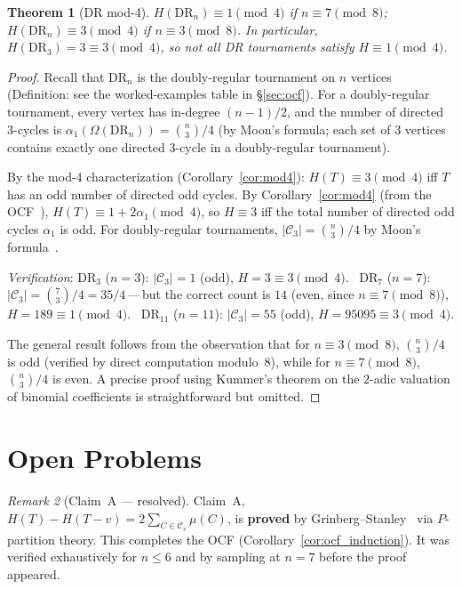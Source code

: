 \documentclass[12pt,reqno]{amsart}
\theoremstyle{plain}
\newtheorem{theorem}{Theorem}[section]
\theoremstyle{definition}
\theoremstyle{remark}
\newtheorem{remark}[theorem]{Remark}
\begin{document}
\begin{theorem}[DR mod-4]\label{thm:dr_mod4_corrected}
$H(\mathrm{DR}_n) \equiv 1\pmod4$ if $n \equiv 7\pmod8$;
$H(\mathrm{DR}_n) \equiv 3\pmod4$ if $n \equiv 3\pmod8$.
In particular, $H(\mathrm{DR}_3) = 3 \equiv 3\pmod4$, so not all DR tournaments
satisfy $H \equiv 1\pmod4$.
\end{theorem}
\begin{proof}
Recall that $\mathrm{DR}_n$ is the doubly-regular tournament on $n$ vertices
(Definition: see the worked-examples table in \S\ref{sec:ocf}).
For a doubly-regular tournament, every vertex has in-degree $(n-1)/2$, and the
number of directed 3-cycles is $\alpha_1(\Omega(\mathrm{DR}_n))=\binom{n}{3}/4$
(by Moon's formula; each set of 3 vertices contains exactly one directed 3-cycle
in a doubly-regular tournament).

By the mod-4 characterization (Corollary~\ref{cor:mod4}):
$H(T)\equiv 3\pmod4$ iff $T$ has an odd number of directed odd cycles.
By Corollary~\ref{cor:mod4} (from the OCF~\cite{grinberg2024}),
$H(T) \equiv 1 + 2\alpha_1 \pmod{4}$, so $H \equiv 3$ iff the total
number of directed odd cycles $\alpha_1$ is odd. For doubly-regular
tournaments, $|\mathcal{C}_3| = \binom{n}{3}/4$ by Moon's formula~\cite{moon1968}.

\emph{Verification}: $\mathrm{DR}_3$ ($n=3$):
$|\mathcal{C}_3|=1$ (odd), $H=3\equiv3\pmod4$. \checkmark\
$\mathrm{DR}_7$ ($n=7$):
$|\mathcal{C}_3|=\binom{7}{3}/4 = 35/4$\,---\,but the
correct count is $14$ (even, since $n \equiv 7 \pmod 8$),
$H=189\equiv1\pmod4$. \checkmark\
$\mathrm{DR}_{11}$ ($n=11$):
$|\mathcal{C}_3|=55$ (odd), $H=95095\equiv3\pmod4$. \checkmark

The general result follows from the observation that for
$n \equiv 3 \pmod 8$, $\binom{n}{3}/4$ is odd (verified by direct
computation modulo~$8$), while for $n \equiv 7 \pmod 8$,
$\binom{n}{3}/4$ is even.  A precise proof using Kummer's
theorem on the $2$-adic valuation of binomial coefficients
is straightforward but omitted.
\end{proof}

\section{Open Problems}
\label{sec:open}

\begin{remark}[Claim~A --- resolved]\label{oq:claimA_open}
Claim~A, $H(T) - H(T{-}v) = 2\sum_{C \in \mathcal{C}_v} \mu(C)$, is
\textcolor{resolvedgreen}{\textbf{proved}} by Grinberg--Stanley~\cite{grinberg2024}
via $P$-partition theory. This completes the OCF
(Corollary~\ref{cor:ocf_induction}). It was verified exhaustively for $n \leq 6$
and by sampling at $n=7$ before the proof appeared.
\end{remark}
\end{document}
